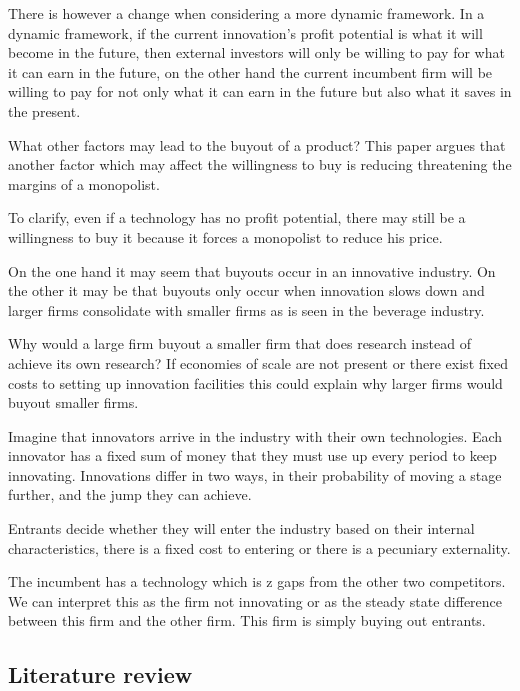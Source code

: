 \documentclass{article}
\begin{document}
There is however a change when considering a more dynamic framework. In a dynamic framework, if the current innovation's profit potential is what it will become in the future, then external investors will only be willing to pay for what it can earn in the future, on the other hand the current incumbent firm will be willing to pay for not only what it can earn in the future but also what it saves in the present.  

What other factors may lead to the buyout of a product? This paper argues that another factor which may affect the willingness to buy is reducing threatening the margins of a monopolist. 

To clarify, even if a technology has no profit potential, there may still be a willingness to buy it because it forces a monopolist to reduce his price. 


On the one hand it may seem that buyouts occur in an innovative industry. On the other it may be that buyouts only occur when innovation slows down and larger firms consolidate with smaller firms as is seen in the beverage industry. 

Why would a large firm buyout a smaller firm that does research instead of achieve its own research? If economies of scale are not present or there exist fixed costs to setting up innovation facilities this could explain why larger firms would buyout smaller firms. 

Imagine that innovators arrive in the industry with their own technologies. Each innovator has a fixed sum of money that they must use up every period to keep innovating. Innovations differ in two ways, in their probability of moving a stage further, and the jump they can achieve. 

Entrants decide whether they will enter the industry based on their internal characteristics, there is a fixed cost to entering or there is a pecuniary externality. 

The incumbent has a technology which is z gaps from the other two competitors. We can interpret this as the firm not innovating or as the steady state difference between this firm and the other firm. This firm is simply buying out entrants. 

\subsection{Literature review}
\end{document}
